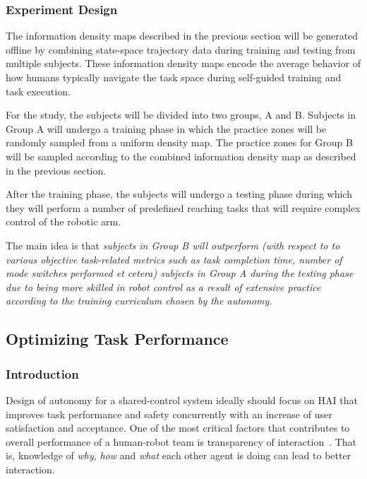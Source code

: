 \documentclass[12pt]{article}
\begin{document}
%
%

\subsubsection{Experiment Design}
The information density maps described in the previous section will be generated offline by combining state-space trajectory data during training and testing from multiple subjects. These information density maps encode the average behavior of how humans typically navigate the task space during self-guided training and task execution. 

For the study, the subjects will be divided into two groups, A and B. 
Subjects in Group A will undergo a training phase in which the practice zones will be randomly sampled from a uniform density map. The practice zones for Group B will be sampled according to the combined information density map as described in the previous section. 

After the training phase, the subjects will undergo a testing phase during which they will perform a number of predefined reaching tasks that will require complex control of the robotic arm. 

The main idea is that \textit{subjects in Group B will outperform (with respect to to various objective task-related metrics such as task completion time, number of mode switches performed \textit{et cetera}) subjects in Group A during the testing phase due to being more skilled in robot control as a result of extensive practice according to the training curriculum chosen by the autonomy.}

\subsection{Optimizing Task Performance}\label{study:rq3}

\subsubsection{Introduction}
Design of autonomy for a shared-control system ideally should focus on HAI that improves task performance and safety concurrently with an increase of user satisfaction and acceptance. One of the most critical factors that contributes to overall performance of a human-robot team is transparency of interaction~\cite{kiesler2005fostering}. That is, knowledge of \textit{why}, \textit{how} and \textit{what} each other agent is doing can lead to better interaction. 
\end{document}
